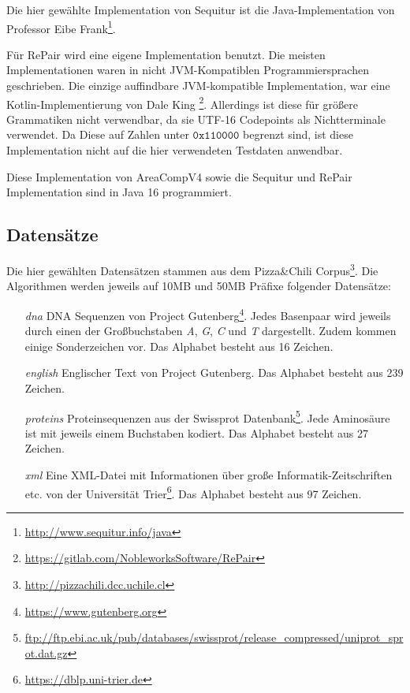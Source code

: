 Die hier gewählte Implementation von Sequitur ist die Java-Implementation von Professor Eibe Frank\footnote{\url{http://www.sequitur.info/java}}. 

Für RePair wird eine eigene Implementation benutzt. Die meisten Implementationen waren in nicht JVM-Kompatiblen Programmiersprachen geschrieben. 
Die einzige auffindbare JVM-kompatible Implementation, war eine Kotlin-Implementierung von Dale King \footnote{\url{https://gitlab.com/NobleworksSoftware/RePair}}. Allerdings ist diese für größere Grammatiken nicht verwendbar, da sie UTF-16 Codepoints als Nichtterminale verwendet. Da Diese auf Zahlen unter $\mathtt{0x110000}$ begrenzt sind, ist diese Implementation nicht auf die hier verwendeten Testdaten anwendbar.

Diese Implementation von AreaCompV4 sowie die Sequitur und RePair Implementation sind in Java 16 programmiert.

\subsection{Datensätze}

Die hier gewählten Datensätzen stammen aus dem Pizza\&Chili Corpus\footnote{\url{http://pizzachili.dcc.uchile.cl}}. Die Algorithmen werden jeweils auf 10MB und 50MB Präfixe folgender Datensätze:

\begin{itemize}
    \item[\emph{dna}] DNA Sequenzen von Project Gutenberg\footnote{\label{footnotegutenberg}\url{https://www.gutenberg.org}}. Jedes Basenpaar wird jeweils durch einen der Großbuchstaben \emph{A}, \emph{G}, \emph{C} und \emph{T} dargestellt. Zudem kommen einige Sonderzeichen vor. Das Alphabet besteht aus 16 Zeichen.
    \item[\emph{english}] Englischer Text von Project Gutenberg. Das Alphabet besteht aus 239 Zeichen.
    \item[\emph{proteins}] Proteinsequenzen aus der Swissprot Datenbank\footnote{\url{ftp://ftp.ebi.ac.uk/pub/databases/swissprot/release_compressed/uniprot_sprot.dat.gz}}. Jede Aminosäure ist mit jeweils einem Buchstaben kodiert. Das Alphabet besteht aus 27 Zeichen.
    \item[\emph{xml}] Eine XML-Datei mit Informationen über große Informatik-Zeitschriften etc. von der Universität Trier\footnote{\url{https://dblp.uni-trier.de}}. Das Alphabet besteht aus 97 Zeichen.
\end{itemize}

